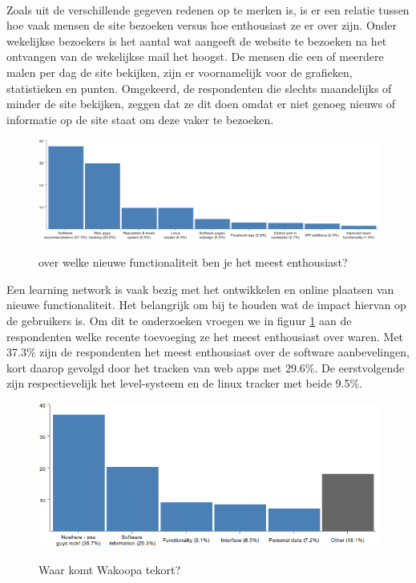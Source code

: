 \documentclass[a4paper, 10pt, pdftex]{report}
\begin{document}
      \paragraph{}Zoals uit de verschillende gegeven redenen op te merken is, is er een relatie tussen hoe vaak mensen de site bezoeken versus hoe enthousiast ze er over zijn. Onder wekelijkse bezoekers is het aantal wat aangeeft de website te bezoeken na het ontvangen van de wekelijkse mail het hoogst. De mensen die een of meerdere malen per dag de site bekijken, zijn er voornamelijk voor de grafieken, statistieken en punten. Omgekeerd, de respondenten die slechts maandelijks of minder de site bekijken, zeggen dat ze dit doen omdat er niet genoeg nieuws of informatie op de site staat om deze vaker te bezoeken.

        \begin{figure}
          \begin{center}
          \caption{over welke nieuwe functionaliteit ben je het meest enthousiast?}
            \includegraphics[width=\textwidth]{../images/enquete/recent-additions}
          \label{fig:enthousiast}
          \end{center}
        \end{figure}

      Een learning network is vaak bezig met het ontwikkelen en online plaatsen van nieuwe functionaliteit. Het belangrijk om bij te houden wat de impact hiervan op de gebruikers is. Om dit te onderzoeken vroegen we in figuur \ref{fig:enthousiast} aan de respondenten welke recente toevoeging ze het meest enthousiast over waren. Met 37.3\% zijn de respondenten het meest enthousiast over de software aanbevelingen, kort daarop gevolgd door het tracken van web apps met 29.6\%. De eerstvolgende zijn respectievelijk het level-systeem en de linux tracker met beide 9.5\%.

        \begin{figure}
          \begin{center}
          \caption{Waar komt Wakoopa tekort?}
            \includegraphics[width=\textwidth]{../images/enquete/improvement}
          \label{fig:improvement}
          \end{center}
        \end{figure}
\end{document}
